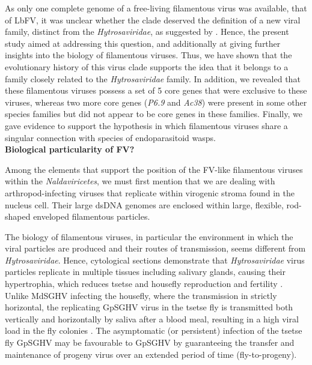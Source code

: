 As only one complete genome of a free-living filamentous virus was available, that of LbFV, it was unclear whether the clade deserved the definition of a new viral family, distinct from the \textit{Hytrosaviridae}, as suggested by \cite{lepetit_genome_2017}. Hence, the present study aimed at addressing this question, and additionally at giving further insights into the biology of filamentous viruses. Thus, we have shown that the evolutionary history of this virus clade supports the idea that it belongs to a family closely related to the \textit{Hytrosaviridae} family. In addition, we revealed that these filamentous viruses possess a set of 5 core genes that were exclusive to these viruses, whereas two more core genes (\textit{P6.9} and \textit{Ac38}) were present in some other species families but did not appear to be core genes in these families.  Finally, we gave evidence to support the hypothesis in which filamentous viruses share a singular connection with species of endoparasitoid wasps.\\

\textbf{Biological particularity of FV?}

Among the elements that support the position of the FV-like filamentous viruses within the \textit{Naldaviricetes}, we must first mention that we are dealing with arthropod-infecting viruses that replicate within virogenic stroma found in the nucleus cell. Their large dsDNA genomes are enclosed within large, flexible, rod-shaped enveloped filamentous particles. 

The biology of filamentous viruses, in particular the environment in which the viral particles are produced and their routes of transmission, seems different from \textit{Hytrosaviridae}. Hence, cytological sections demonstrate that \textit{Hytrosaviridae} virus particles replicate in multiple tissues including salivary glands, causing their hypertrophia, which reduces tsetse and housefly reproduction and fertility \citep{abd-alla_tsetse_2011}. Unlike MdSGHV infecting the housefly, where the transmission in strictly horizontal, the replicating GpSGHV virus in the tsetse fly is transmitted both vertically and horizontally by saliva after a blood meal, resulting in a high viral load in the fly colonies \citep{kariithi_hytrosaviruses_2017}. The asymptomatic (or persistent) infection of the tsetse fly GpSGHV may be favourable to GpSGHV by guaranteeing the transfer and maintenance of progeny virus over an extended period of time (fly-to-progeny)\citep{boucias_transgenerational_2013}. 

